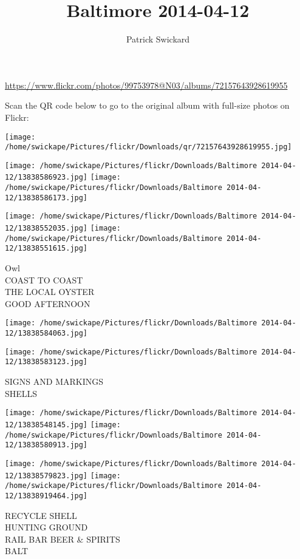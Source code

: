 \documentclass[10pt,letterpaper]{article}
\title{Baltimore 2014-04-12}
\author{Patrick Swickard}
\date{}
\begin{document}
\maketitle

\url{https://www.flickr.com/photos/99753978@N03/albums/72157643928619955}

Scan the QR code below to go to the original album with full-size photos on Flickr:

\texttt{[image: /home/swickape/Pictures/flickr/Downloads/qr/72157643928619955.jpg]}
\pagebreak

\texttt{[image: /home/swickape/Pictures/flickr/Downloads/Baltimore 2014-04-12/13838586923.jpg]}
\texttt{[image: /home/swickape/Pictures/flickr/Downloads/Baltimore 2014-04-12/13838586173.jpg]}

\texttt{[image: /home/swickape/Pictures/flickr/Downloads/Baltimore 2014-04-12/13838552035.jpg]}
\texttt{[image: /home/swickape/Pictures/flickr/Downloads/Baltimore 2014-04-12/13838551615.jpg]}

Owl\\
COAST TO COAST\\
THE LOCAL OYSTER\\
GOOD AFTERNOON
\pagebreak

\texttt{[image: /home/swickape/Pictures/flickr/Downloads/Baltimore 2014-04-12/13838584063.jpg]}

\vspace{0.25in}
\texttt{[image: /home/swickape/Pictures/flickr/Downloads/Baltimore 2014-04-12/13838583123.jpg]}

SIGNS AND MARKINGS\\
SHELLS
\pagebreak

\texttt{[image: /home/swickape/Pictures/flickr/Downloads/Baltimore 2014-04-12/13838548145.jpg]}
\texttt{[image: /home/swickape/Pictures/flickr/Downloads/Baltimore 2014-04-12/13838580913.jpg]}

\texttt{[image: /home/swickape/Pictures/flickr/Downloads/Baltimore 2014-04-12/13838579823.jpg]}
\texttt{[image: /home/swickape/Pictures/flickr/Downloads/Baltimore 2014-04-12/13838919464.jpg]}

RECYCLE SHELL\\
HUNTING GROUND\\
RAIL BAR BEER \& SPIRITS\\
BALT
\pagebreak
\end{document}
